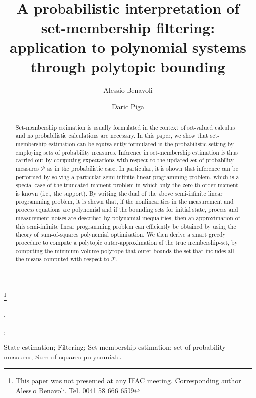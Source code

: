 \documentclass[twocolumn]{autart}
\newcommand{\DP}[1]{{#1}}
\begin{document}
\begin{frontmatter}

\title{A probabilistic interpretation of set-membership filtering: application to polynomial systems through polytopic bounding}

\thanks[footnoteinfo]{This paper was not presented at any IFAC
meeting. Corresponding author Alessio Benavoli. Tel.  0041 58 666 6509}


\author[IDSIA]{Alessio Benavoli}, %
\author[IMT]{Dario Piga}, %


\address[IDSIA]{IDSIA Dalle Molle Institute for Artificial Intelligence SUPSI-USI, Manno, Switzerland.}
\address[IMT]{IMT Institute for Advanced Studies Lucca, Piazza San Francesco 19, 55100 Lucca, Italy.}


\begin{keyword}                           %
State estimation; Filtering; Set-membership estimation; set of probability measures; Sum-of-squares polynomials.
\end{keyword}                             %


\begin{abstract}
{Set-membership estimation is usually formulated in the context of set-valued calculus
and no probabilistic calculations are necessary.}
In this paper, we show that set-membership estimation can  be equivalently formulated in the probabilistic setting by employing sets of probability measures.
\DP{Inference} in set-membership estimation  \DP{is} thus carried out by computing expectations \DP{with respect to}  the updated
set of probability measures $\mathcal{P}$ as in the probabilistic case.
In particular, \DP{it is shown that inference can be performed} by solving a particular semi-infinite linear programming problem,
which is a special case of the truncated moment problem in which only the zero-th order moment is known (i.e., the support).
By writing the dual of the above semi-infinite linear programming problem, \DP{it is  shown} that, if the nonlinearities in the measurement and process equations are \DP{polynomial} and if the bounding sets for initial state, process and measurement noises are described by polynomial inequalities, then an approximation of this semi-infinite linear programming problem can efficiently be obtained by using the theory of sum-of-squares polynomial optimization. We then derive a smart greedy procedure to compute a polytopic outer-approximation of the true membership-set, by computing the  minimum-volume polytope
that outer-bounds the set that includes all the means computed \DP{with respect to}  $\mathcal{P}$.

\end{abstract}

\end{frontmatter}
\end{document}
